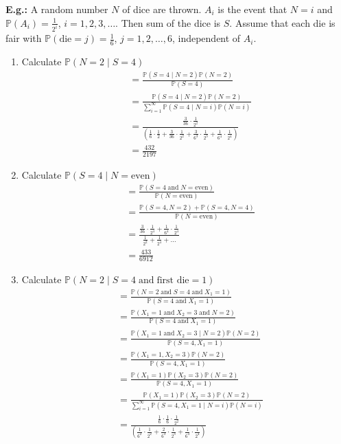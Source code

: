\documentclass[a4paper]{article}
\newcommand{\n}{\hfill\break}
\newcommand{\eg}[1]{\par\noindent\settowidth{\hangindent}{\textbf{E.g.: }}\textbf{E.g.: }#1\n}
\newcommand{\Prob}{\mathbb{P}}
\renewcommand{\P}{\Prob}
\newcommand{\tand}{\;\text{and}\;}
\begin{document}
\eg{A random number $N$ of dice are thrown. $A_i$ is the event that $N=i$ and $\P(A_i)=\frac{1}{2^i}$, $i=1, 2, 3, \dots$. Then sum of the dice is $S$. Assume that each die is fair with $\P(\text{die}=j)=\frac{1}{6}$, $j=1, 2, \dots, 6$, independent of $A_i$.
\begin{enumerate}
    \item Calculate $\P(N=2\mid S=4)$
        \begin{align*}
            &=\frac{\P(S=4\mid N=2)\P(N=2)}{\P(S=4)} \\
            &=\frac{\P(S=4\mid N=2)\P(N=2)}{\sum_{i=1}^\infty\P(S=4\mid N=i)\P(N=i)} \\
            &=\frac{\frac{3}{36}\cdot\frac{1}{2^2}}{(\frac{1}{6}\cdot\frac{1}{2}+\frac{3}{36}\cdot\frac{1}{2^2}+\frac{3}{6^3}\cdot\frac{1}{2^3}+\frac{1}{6^4}\cdot\frac{1}{2^4})} \\
            &=\frac{432}{2197}
        \end{align*}
    \item Calculate $\P(S=4\mid N=\text{even})$
        \begin{align*}
            &=\frac{\P(S=4\;\text{and}\;N=\text{even})}{\P(N=\text{even})} \\
            &=\frac{\P(S=4, N=2)+\P(S=4, N=4)}{\P(N=\text{even})} \\
            &=\frac{\frac{3}{36}\cdot\frac{1}{2^4}+\frac{1}{6^4}\cdot\frac{1}{2^4}}{\frac{1}{2^2}+\frac{1}{2^4}+\dots} \\
            &=\frac{433}{6912}
        \end{align*}
    \item Calculate $\P(N=2\mid S=4\tand\text{first die}=1)$
    \begin{align*}
        &=\frac{\P(N=2\tand S=4\tand X_1=1)}{\P(S=4\tand X_1=1)} \\
        &=\frac{\P(X_1=1\tand X_2=3\tand N=2)}{\P(S=4\tand X_1=1)} \\
        &=\frac{\P(X_1=1\tand X_2=3\mid N=2)\P(N=2)}{\P(S=4, X_1=1)} \\
        &=\frac{\P(X_1=1, X_2=3)\P(N=2)}{\P(S=4, X_1=1)} \\
        &=\frac{\P(X_1=1)\P(X_2=3)\P(N=2)}{\P(S=4, X_1=1)} \\
        &=\frac{\P(X_1=1)\P(X_2=3)\P(N=2)}{\sum_{i=1}^\infty\P(S=4, X_1=1\mid N=i)\P(N=i)} \\
        &=\frac{\frac{1}{6}\cdot\frac{1}{6}\cdot\frac{1}{2^2}}{(\frac{1}{6^2}\cdot\frac{1}{2^2}+\frac{2}{6^3}\cdot\frac{1}{2^3}+\frac{1}{6^4}\cdot\frac{1}{2^4})} \\

\end{align*}
\end{enumerate}}
\end{document}
